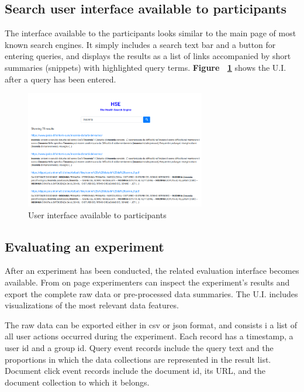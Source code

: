 \documentclass[]{usiinfbachelorproject}
\begin{document}
\subsection{Search user interface available to participants}

The interface available to the participants looks similar to the main page of most known search engines. It simply
includes a search text bar and a button for entering queries, and displays the results as a list of
links accompanied by short summaries (snippets) with highlighted query terms. 
\textbf{Figure ~\ref{fig:searchUi}} shows the U.I. after a query has been entered.

\begin{figure} [h]
\centering
\includegraphics[width=0.7\textwidth]{img/searchUi}
\caption{User interface available to participants}
\label{fig:searchUi}
\end{figure}

\subsection{Evaluating an experiment}

After an experiment has been conducted, the  related evaluation interface becomes available. From on page
experimenters can inspect the experiment's results and export  the complete raw data
or pre-processed data summaries. The U.I. includes visualizations of the most relevant data features.

The raw data can be exported either in csv or json format, and consists i a list of all user actions occurred during the experiment. 
Each record has a timestamp, a user id and a group id. Query event records include the query text and the proportions in which
the data collections are represented  in the result list. Document click event records include the document id, its URL, and
the document collection to which it belongs.
\end{document}
